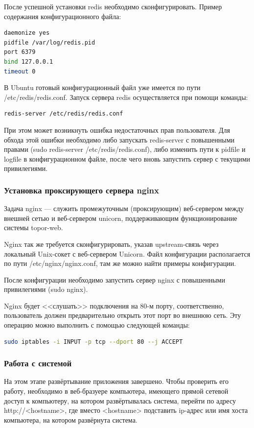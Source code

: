 После успешной установки redis необходимо сконфигурировать. Пример
содержания конфигурационного файла:
\begin{lstlisting}[language=bash]
daemonize yes
pidfile /var/log/redis.pid
port 6379
bind 127.0.0.1
timeout 0
\end{lstlisting}

В Ubuntu готовый конфигурационный файл уже имеется по пути
/etc/redis/redis.conf. Запуск сервера redis осуществляется при помощи
команды:
\begin{lstlisting}[language=bash]
redis-server /etc/redis/redis.conf
\end{lstlisting}

При этом может возникнуть ошибка недостаточных прав пользователя.
Для обхода этой ошибки необходимо либо запускать redis-server с
повышенными
правами
(sudo
redis-server
/etc/redis/redis.conf), либо изменить пути к pidfile и logfile в
конфигурационном файле, после чего вновь запустить сервер с текущими
привилегиями.

\subsubsection{Установка проксирующего сервера nginx}

Задача nginx --- служить промежуточным (проксирующим) веб-сервером
между
внешней
сетью
и
веб-сервером
unicorn,
поддерживающим
функционирование системы topor-web.

Nginx так же требуется сконфигурировать, указав upstream-связь через локальный Unix-сокет с веб-сервером Unicorn. Файл конфигурации
располагается по пути /etc/nginx/nginx.conf, там же можно найти примеры конфигурации.

После
конфигурации
необходимо
запустить
сервер
nginx
с
повышенными привилегиями (sudo nginx).

Nginx будет <<слушать>> подключения на 80-м порту, соответственно,
пользователь должен предварительно открыть этот порт во внешнюю сеть. Эту
операцию можно выполнить с помощью следующей команды:
\begin{lstlisting}[language=bash]
sudo iptables -i INPUT -p tcp --dport 80 --j ACCEPT
\end{lstlisting}

\subsubsection{Работа с системой}

На этом этапе развёртывание приложения завершено. Чтобы проверить
его работу, необходимо в веб-бразуере компьютера, имеющего прямой сетевой
доступ к компьютеру, на котором развёртывалась система, перейти по адресу
http://<hostname>, где вместо <hostname> подставить ip-адрес или имя хоста
компьютера, на котором развёрнута система.

